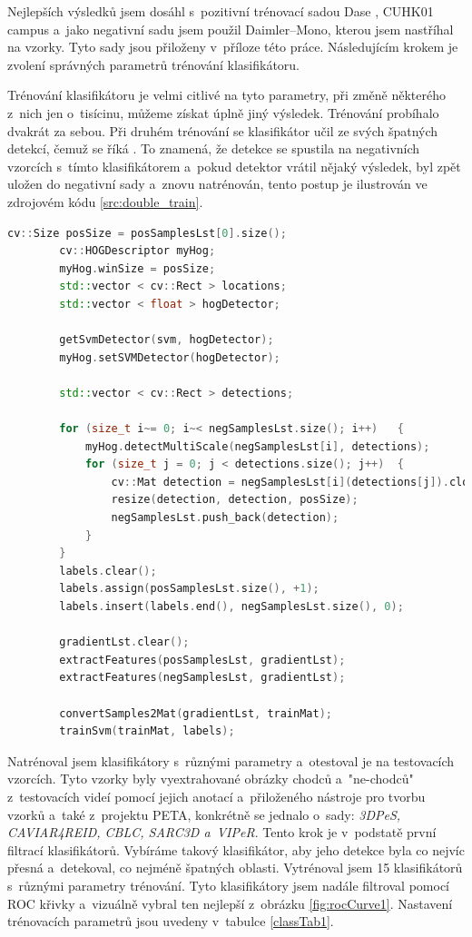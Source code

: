 Nejlepších výsledků jsem dosáhl s~pozitivní trénovací sadou Dase \cite{sudipdas}, CUHK01 campus \cite{cuhk} a~jako negativní sadu jsem použil Daimler--Mono\cite{daimler}, kterou jsem nastříhal na vzorky. Tyto sady jsou přiloženy v~příloze této práce. Následujícím krokem je zvolení správných parametrů trénování klasifikátoru. 

Trénování klasifikátoru je velmi citlivé na tyto parametry, při změně některého z~nich jen o~tisícinu, můžeme získat úplně jiný výsledek. Trénování probíhalo dvakrát za sebou. Při druhém trénování se klasifikátor učil ze svých špatných detekcí, čemuž se říká . To znamená, že detekce se spustila na negativních vzorcích s~tímto klasifikátorem a~pokud detektor vrátil nějaký výsledek, byl zpět uložen do negativní sady a~znovu natrénován, tento postup je ilustrován ve zdrojovém kódu \ref{src:double_train}.
\newpage

\begin{lstlisting}[label=src:double_train, language=cpp, caption=Bootstrapping]
		cv::Size posSize = posSamplesLst[0].size();
		cv::HOGDescriptor myHog;
		myHog.winSize = posSize;
		std::vector < cv::Rect > locations;
		std::vector < float > hogDetector;
		
		getSvmDetector(svm, hogDetector);
		myHog.setSVMDetector(hogDetector);

		std::vector < cv::Rect > detections;

		for (size_t i~= 0; i~< negSamplesLst.size(); i++)	{
			myHog.detectMultiScale(negSamplesLst[i], detections);
			for (size_t j = 0; j < detections.size(); j++)	{
				cv::Mat detection = negSamplesLst[i](detections[j]).clone();
				resize(detection, detection, posSize);
				negSamplesLst.push_back(detection);
			}
		}
		labels.clear();
		labels.assign(posSamplesLst.size(), +1);
		labels.insert(labels.end(), negSamplesLst.size(), 0);

		gradientLst.clear();
		extractFeatures(posSamplesLst, gradientLst);
		extractFeatures(negSamplesLst, gradientLst);

		convertSamples2Mat(gradientLst, trainMat);
		trainSvm(trainMat, labels);
\end{lstlisting}

Natrénoval jsem klasifikátory s~různými parametry a~otestoval je na testovacích vzorcích. Tyto vzorky byly vyextrahované obrázky chodců a~"ne-chodců" z~testovacích videí pomocí jejich anotací a~přiloženého nástroje pro tvorbu vzorků a~také z~projektu PETA, konkrétně se jednalo o~sady: \textit{3DPeS, CAVIAR4REID, CBLC, SARC3D a~VIPeR}\cite{peta}. Tento krok je v~podstatě první filtrací klasifikátorů. Vybíráme takový klasifikátor, aby jeho detekce byla co nejvíc přesná a~detekoval, co nejméně špatných oblasti. Vytrénoval jsem 15 klasifikátorů s~různými parametry trénování. Tyto klasifikátory jsem nadále filtroval pomocí ROC křivky a~vizuálně vybral ten nejlepší z~obrázku \ref{fig:rocCurve1}.  Nastavení trénovacích parametrů jsou uvedeny v~tabulce \ref{classTab1}.  


